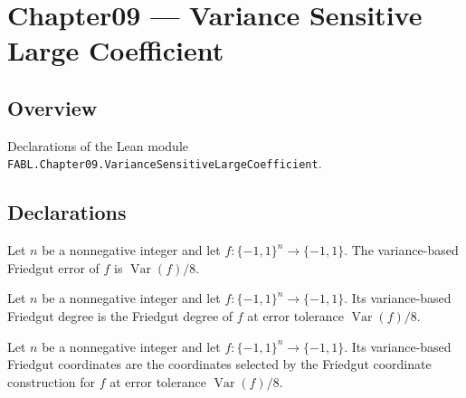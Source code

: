 \chapter{Chapter09 — Variance Sensitive Large Coefficient}
\section{Overview}

Declarations of the Lean module \texttt{FABL.Chapter09.VarianceSensitiveLargeCoefficient}.

\section{Declarations}

\begin{definition}
\label{FABL.varianceFriedgutError}
\leanok
{}
Let $n$ be a nonnegative integer and let $f:\{-1,1\}^n\to\{-1,1\}$. The variance-based
Friedgut error of $f$ is $\operatorname{Var}(f)/8$.
\end{definition}

\begin{definition}
\label{FABL.varianceFriedgutDegree}
\leanok
{}
Let $n$ be a nonnegative integer and let $f:\{-1,1\}^n\to\{-1,1\}$. Its variance-based
Friedgut degree is the Friedgut degree of $f$ at error tolerance
$\operatorname{Var}(f)/8$.
\end{definition}

\begin{definition}
\label{FABL.varianceFriedgutCoordinates}
\leanok
{}
Let $n$ be a nonnegative integer and let $f:\{-1,1\}^n\to\{-1,1\}$. Its variance-based
Friedgut coordinates are the coordinates selected by the Friedgut coordinate
construction for $f$ at error tolerance $\operatorname{Var}(f)/8$.
\end{definition}

